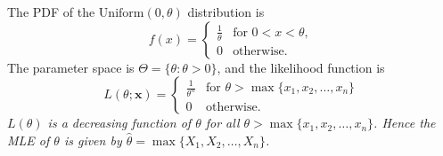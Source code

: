 \begin{solution}
The PDF of the $\text{Uniform}(0,\theta)$ distribution is
\[
f(x) = \left\{\begin{array}{ll}
	\displaystyle\frac{1}{\theta}	& \text{for } 0 < x < \theta, \\[2ex]
	0				& \text{otherwise}.
\end{array}\right.
\]
The parameter space is $\Theta = \{\theta:\theta>0\}$, and the likelihood function is
\[
L(\theta;\mathbf{x}) = \left\{\begin{array}{ll}
	\displaystyle\frac{1}{\theta^n}	& \text{for } \theta > \max\{x_1,x_2,\ldots,x_n\} \\[2ex]
	0				& \text{otherwise}.
\end{array}\right.
\]
\bit
\it $L(\theta)$ is a decreasing function of $\theta$ for all $\theta>\max\{x_1,x_2,\ldots,x_n\}$.
\it Hence the MLE of $\theta$ is given by $\hat{\theta} = \max\{X_1,X_2,\ldots,X_n\}$.
\eit
\end{solution}
\stopcontents[chapters]
\endinput
